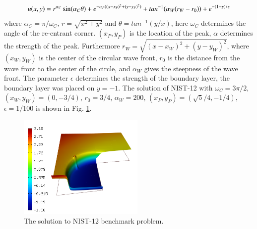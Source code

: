 \documentclass[12pt]{elsarticle}
\begin{document}
\[
u(x,y) =  r^{\alpha_{C} }\sin(\alpha_{C} \theta)
+ e^{-\alpha_{P} ((x - x_{P})^{2} + (y - y_{P})^{2})}
+ tan^{-1}(\alpha_{W} (r_{W} - r_{0})) \\
+ e^{-(1 - y) / \epsilon}
\]
where $\alpha_C = \pi / \omega_C$, $r = \sqrt{x^2+y^2}$
and $\theta = tan^{-1}(y/x)$, here $\omega_C$ determines
the angle of the re-entrant corner.
$(x_{P}, y_{P})$ is the location of the peak, $\alpha$
determines the strength of the peak. Furthermore
$r_{W} = \sqrt{(x - x_{W})^{2} + (y - y_{W})^{2}}$,
where $(x_{W}, y_{W})$ is the center of the circular wave front,
$r_{0}$ is the distance from the wave front to the
center of the circle, and $\alpha_W$ gives
the steepness of the wave front. The parameter $\epsilon$ determines the
strength of the boundary layer, the boundary layer was placed on $y = -1$.
The solution of NIST-12 with $\omega_C = 3 \pi /2$,
$(x_{W}, y_{W}) = (0, -3/4)$, $r_{0} = 3/4$, $\alpha_{W} = 200$,
$(x_{P}, y_{P}) = (\sqrt{5} / 4, -1/4)$,
$\epsilon = 1/100$ is shown in Fig. \ref{fig:sln-nist12}.

\begin{figure}[H]
\centering
\includegraphics[height=5cm]{nist/nist-12/solution.png}
\vspace{-3mm}
\caption{The solution to NIST-12 benchmark problem.}
\vspace{-4mm}
\label{fig:sln-nist12}
\end{figure}
\end{document}
